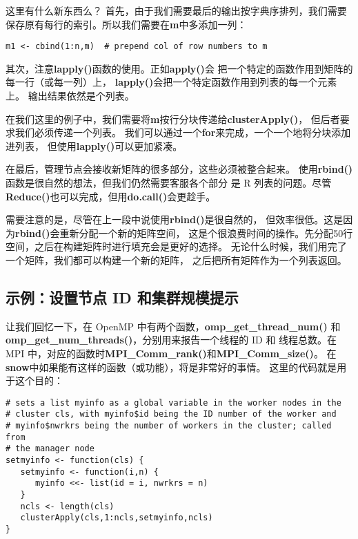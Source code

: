 这里有什么新东西么？
首先，由于我们需要最后的输出按字典序排列，我们需要
保存原有每行的索引。所以我们需要在{\bf m}中多添加一列：

\begin{lstlisting}
m1 <- cbind(1:n,m)  # prepend col of row numbers to m
\end{lstlisting}

其次，注意{\bf lapply()}函数的使用。正如{\bf apply()}会
把一个特定的函数作用到矩阵的每一行（或每一列）上，
{\bf lapply()}会把一个特定函数作用到列表的每一个元素上。
输出结果依然是个列表。

在我们这里的例子中，我们需要将{\bf m}按行分块传递给{\bf clusterApply()}，
但后者要求我们必须传递一个列表。
我们可以通过一个{\bf for}来完成，一个一个地将分块添加进列表，
但使用{\bf lapply()}可以更加紧凑。

在最后，管理节点会接收新矩阵的很多部分，这些必须被整合起来。
使用{\bf rbind()}函数是很自然的想法，但我们仍然需要客服各个部分
是 R 列表的问题。尽管{\bf Reduce()}也可以完成，但用{\bf do.call()}会更趁手。

需要注意的是，尽管在上一段中说使用{\bf rbind()}是很自然的，
但效率很低。这是因为{\bf rbind()}会重新分配一个新的矩阵空间，
这是个很浪费时间的操作。先分配50行空间，之后在构建矩阵时进行填充会是更好的选择。
无论什么时候，我们用完了一个矩阵，我们都可以构建一个新的矩阵，
之后把所有矩阵作为一个列表返回。

\subsection{示例：设置节点 ID 和集群规模提示}

让我们回忆一下，在 OpenMP 中有两个函数，{\bf omp\_get\_thread\_num()}
和\\
{\bf omp\_get\_num\_threads()}，分别用来报告一个线程的 ID 和
线程总数。在 MPI 中，对应的函数时{\bf MPI\_Comm\_rank()}和{\bf MPI\_Comm\_size()}。
在{\bf snow}中如果能有这样的函数（或功能），将是非常好的事情。
这里的代码就是用于这个目的：

\begin{lstlisting}
# sets a list myinfo as a global variable in the worker nodes in the
# cluster cls, with myinfo$id being the ID number of the worker and
# myinfo$nwrkrs being the number of workers in the cluster; called from
# the manager node
setmyinfo <- function(cls) {
   setmyinfo <- function(i,n) {
      myinfo <<- list(id = i, nwrkrs = n)
   }
   ncls <- length(cls)
   clusterApply(cls,1:ncls,setmyinfo,ncls)
}
\end{lstlisting}

